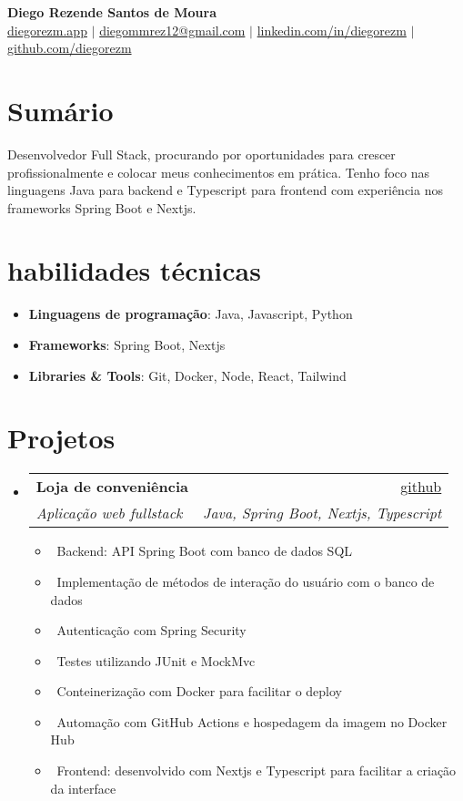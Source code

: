\documentclass[letterpaper,10pt]{article}
\makeatletter
\newcommand{\resumeItem}[1]{\item\small{#1}}
\newcommand{\resumeSubheading}[4]{
\vspace{-1pt}\item
  \begin{tabular*}{0.97\textwidth}[t]{l@{\extracolsep{\fill}}r}
    \textbf{#1} & #2 \\
    \textit{#3} & \textit{#4} \\
  \end{tabular*}\vspace{-7pt}
}
\newcommand{\resumeSubHeadingList}{\begin{itemize}[leftmargin=0.15in, label={}]}
\newcommand{\resumeSubHeadingListEnd}{\end{itemize}}
\makeatother
\begin{document}
\begin{center}
  \textbf{\Huge Diego Rezende Santos de Moura} \\
  \small \href{https://diegorezm.netlify.app/}{diegorezm.app} $|$ \href{mailto:diegommrez12@gmail.com}{diegommrez12@gmail.com} $|$ 
  \href{https://linkedin.com/in/diegorezm}{linkedin.com/in/diegorezm} $|$
  \href{https://github.com/diegorezm}{github.com/diegorezm}
\end{center}

\section*{Sumário}
Desenvolvedor Full Stack, procurando por oportunidades para crescer profissionalmente e colocar meus conhecimentos em prática. Tenho foco nas linguagens Java para backend e Typescript para frontend com experiência nos frameworks Spring Boot e Nextjs.

\section{habilidades técnicas}
\resumeSubHeadingList
  \resumeItem{\textbf{Linguagens de programação}: Java, Javascript, Python}
  \resumeItem{\textbf{Frameworks}: Spring Boot, Nextjs}
  \resumeItem{\textbf{Libraries \& Tools}: Git, Docker, Node, React, Tailwind}
\resumeSubHeadingListEnd

\section{Projetos}
\resumeSubHeadingList
  \resumeSubheading
      {Loja de conveniência}{\href{https://github.com/diegorezm/convenience.store.api}{github}} 
      {Aplicação web fullstack}{Java, Spring Boot, Nextjs, Typescript}
      \resumeSubHeadingList
          \resumeItem{\textbullet\ Backend: API Spring Boot com banco de dados SQL}
          \resumeItem{\textbullet\ Implementação de métodos de interação do usuário com o banco de dados}
          \resumeItem{\textbullet\ Autenticação com Spring Security}
          \resumeItem{\textbullet\ Testes utilizando JUnit e MockMvc}
          \resumeItem{\textbullet\ Conteinerização com Docker para facilitar o deploy}
          \resumeItem{\textbullet\ Automação com GitHub Actions e hospedagem da imagem no Docker Hub}
          \resumeItem{\textbullet\ Frontend: desenvolvido com Nextjs e Typescript para facilitar a criação da interface}
      \resumeSubHeadingListEnd
\resumeSubHeadingListEnd
\end{document}
